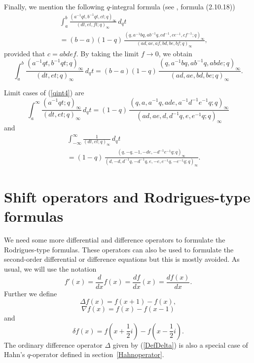 \documentclass[envcountchap,graybox]{svmono}
\begin{document}
\noindent
Finally, we mention the following $q$-integral formula (see \cite{GasperRahman90}, formula (2.10.18))
\begin{eqnarray}
\label{qint3}
& &\int_a^b\frac{\left(a^{-1}qt,b^{-1}qt,ct;q\right)_{\infty}}{\left(dt,et,ft;q\right)_{\infty}}\,d_qt\nonumber\\
& &{}=(b-a)(1-q)\,\frac{\left(q,a^{-1}bq,ab^{-1}q,cd^{-1},ce^{-1},cf^{-1};q\right)_{\infty}}
{\left(ad,ae,af,bd,be,bf;q\right)_{\infty}},
\end{eqnarray}
provided that $c=abdef$. By taking the limit $f\rightarrow 0$, we obtain
\begin{equation}
\label{qint4}
\int_a^b\frac{\left(a^{-1}qt,b^{-1}qt;q\right)_{\infty}}{\left(dt,et;q\right)_{\infty}}\,d_qt
=(b-a)(1-q)\,\frac{\left(q,a^{-1}bq,ab^{-1}q,abde;q\right)_{\infty}}{\left(ad,ae,bd,be;q\right)_{\infty}}.
\end{equation}

\vspace{5mm}

\noindent
Limit cases of (\ref{qint4}) are
\begin{equation}
\label{qint5}
\int_a^{\infty}\frac{\left(a^{-1}qt;q\right)_{\infty}}{\left(dt,et;q\right)_{\infty}}\,d_qt
=(1-q)\,\frac{\left(q,a,a^{-1}q,ade,a^{-1}d^{-1}e^{-1}q;q\right)_{\infty}}
{\left(ad,ae,d,d^{-1}q,e,e^{-1}q;q\right)_{\infty}}
\end{equation}
and
\begin{eqnarray}
\label{qint6}
& &\int_{-\infty}^{\infty}\frac{1}{\left(dt,et;q\right)_{\infty}}\,d_qt\nonumber\\
& &{}=(1-q)\,\frac{\left(q,-q,-1,-de,-d^{-1}e^{-1}q;q\right)_{\infty}}
{\left(d,-d,d^{-1}q,-d^{-1}q,e,-e,e^{-1}q,-e^{-1}q;q\right)_{\infty}}.
\end{eqnarray}

\section{Shift operators and Rodrigues-type formulas}
\par\setcounter{equation}{0}
\label{shift operators}

We need some more differential and difference operators to formulate the
Rodrigues-type formulas. These operators can also be used to formulate the
second-order differential or difference equations but this is mostly avoided.
As usual, we will use the notation
$$f'(x)=\frac{d}{dx}f(x)=\frac{df}{dx}(x)=\frac{df(x)}{dx}.$$
Further we define
\begin{equation}
\label{DefDelta}
\Delta f(x)=f(x+1)-f(x),
\end{equation}
\begin{equation}
\label{DefNabla}
\nabla f(x)=f(x)-f(x-1)
\end{equation}
and
\begin{equation}
\label{delta-operator}
\delta f(x)=f(x+\textstyle\frac{1}{2}i)-f(x-\textstyle\frac{1}{2}i).
\end{equation}
The ordinary difference operator $\Delta$ given by (\ref{DefDelta}) is also a
special case of Hahn's $q$-operator defined in section~\ref{Hahnoperator}.
\end{document}
